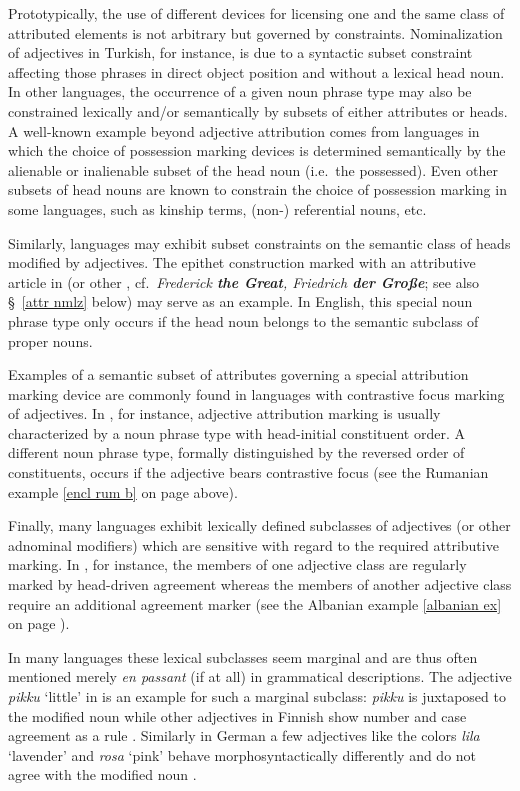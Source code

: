 Prototypically, the use of different devices for licensing one and the same class of attributed elements is not arbitrary but governed by constraints. Nominalization of adjectives in Turkish, for instance, is due to a syntactic subset constraint affecting those phrases in direct object position and without a lexical head noun. In other languages, the occurrence of a given noun phrase type may also be constrained lexically and/or semantically by subsets of either attributes or heads. A well-known example beyond adjective attribution comes from languages in which the choice of possession marking devices is determined semantically by the alienable or inalienable subset of the head noun (i.e.~the possessed). Even other subsets of head nouns are known to constrain the choice of possession marking in some languages, such as kinship terms, (non-) referential nouns, etc.

Similarly, languages may exhibit subset constraints on the semantic class of heads modified by adjectives. The epithet construction marked with an attributive article in  (or other , cf.~\textit{Frederick \textbf{the Great}, Friedrich \textbf{der Große}}; see also \S~\ref{attr nmlz} below) may serve as an example. In English, this special noun phrase type only occurs if the head noun belongs to the semantic subclass of proper nouns.

Examples of a semantic subset of attributes governing a special attribution marking device are commonly found in languages with contrastive focus marking of adjectives. In , for instance, adjective attribution marking is usually characterized by a noun phrase type with head-initial constituent order. A different noun phrase type, formally distinguished by the reversed order of constituents, occurs if the adjective bears contrastive focus (see the Rumanian example \ref{encl rum b} on page \pageref{encl rum b} above).

Finally, many languages exhibit lexically defined subclasses of adjectives (or other adnominal modifiers) which are sensitive with regard to the required attributive marking. In , for instance, the members of one adjective class are regularly marked by head\hyp{}driven agreement whereas the members of another adjective class require an additional agreement marker (see the Albanian example \ref{albanian ex} on page \pageref{albanian synchr}).

In many languages these lexical subclasses seem marginal and are thus often mentioned merely \emph{en passant} (if at all) in grammatical descriptions. The adjective \textit{pikku} ‘little’ in  is an example for such a marginal subclass: \textit{pikku} is juxtaposed to the modified noun while other adjectives in Finnish show number and case agreement as a rule \citep[75]{karlsson1999}. Similarly in German a few adjectives like the colors \textit{lila} ‘lavender’ and \textit{rosa} ‘pink’ behave morphosyntactically differently and do not agree with the modified noun \citep[cf. also][243]{schafer2015a}.  

